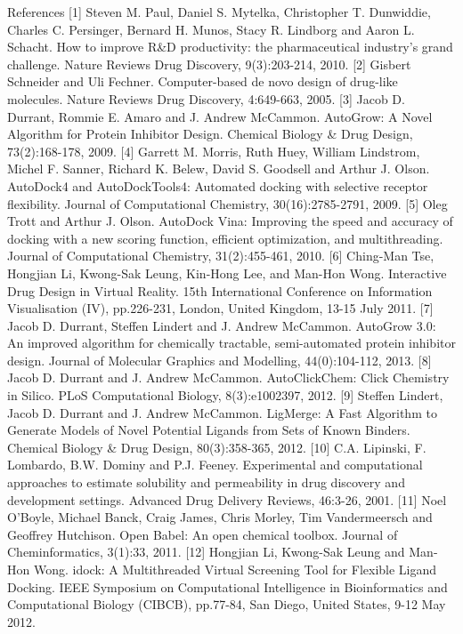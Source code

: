 References
[1] 	Steven M. Paul, Daniel S. Mytelka, Christopher T. Dunwiddie, Charles C. Persinger, Bernard H. Munos, Stacy R. Lindborg and Aaron L. Schacht. How to improve R&D productivity: the pharmaceutical industry's grand challenge. Nature Reviews Drug Discovery, 9(3):203-214, 2010.
[2] 	Gisbert Schneider and Uli Fechner. Computer-based de novo design of drug-like molecules. Nature Reviews Drug Discovery, 4:649-663, 2005.
[3] 	Jacob D. Durrant, Rommie E. Amaro and J. Andrew McCammon. AutoGrow: A Novel Algorithm for Protein Inhibitor Design. Chemical Biology & Drug Design, 73(2):168-178, 2009.
[4] 	Garrett M. Morris, Ruth Huey, William Lindstrom, Michel F. Sanner, Richard K. Belew, David S. Goodsell and Arthur J. Olson. AutoDock4 and AutoDockTools4: Automated docking with selective receptor flexibility. Journal of Computational Chemistry, 30(16):2785-2791, 2009.
[5] 	Oleg Trott and Arthur J. Olson. AutoDock Vina: Improving the speed and accuracy of docking with a new scoring function, efficient optimization, and multithreading. Journal of Computational Chemistry, 31(2):455-461, 2010.
[6] 	Ching-Man Tse, Hongjian Li, Kwong-Sak Leung, Kin-Hong Lee, and Man-Hon Wong. Interactive Drug Design in Virtual Reality. 15th International Conference on Information Visualisation (IV), pp.226-231, London, United Kingdom, 13-15 July 2011.
[7] 	Jacob D. Durrant, Steffen Lindert and J. Andrew McCammon. AutoGrow 3.0: An improved algorithm for chemically tractable, semi-automated protein inhibitor design. Journal of Molecular Graphics and Modelling, 44(0):104-112, 2013.
[8] 	Jacob D. Durrant and J. Andrew McCammon. AutoClickChem: Click Chemistry in Silico. PLoS Computational Biology, 8(3):e1002397, 2012.
[9] 	Steffen Lindert, Jacob D. Durrant and J. Andrew McCammon. LigMerge: A Fast Algorithm to Generate Models of Novel Potential Ligands from Sets of Known Binders. Chemical Biology & Drug Design, 80(3):358-365, 2012.
[10] 	C.A. Lipinski, F. Lombardo, B.W. Dominy and P.J. Feeney. Experimental and computational approaches to estimate solubility and permeability in drug discovery and development settings. Advanced Drug Delivery Reviews, 46:3-26, 2001.
[11] 	Noel O'Boyle, Michael Banck, Craig James, Chris Morley, Tim Vandermeersch and Geoffrey Hutchison. Open Babel: An open chemical toolbox. Journal of Cheminformatics, 3(1):33, 2011.
[12] 	Hongjian Li, Kwong-Sak Leung and Man-Hon Wong. idock: A Multithreaded Virtual Screening Tool for Flexible Ligand Docking. IEEE Symposium on Computational Intelligence in Bioinformatics and Computational Biology (CIBCB), pp.77-84, San Diego, United States, 9-12 May 2012.
